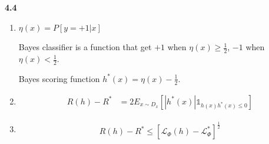 \documentclass[12pt]{article}
\begin{document}
\noindent \textbf{4.4}

\begin{enumerate}[label=(\alph*), left=0pt]
    \item 
    $\eta(x) = P[y=+1 | x]$

    Bayes classifier is a function that get $+1$ when $\eta(x) \ge \frac{1}{2}$, $-1$ when $\eta(x) <
    \frac{1}{2}$. 

    Bayes scoring function $h^{*}(x) = \eta(x) - \frac{1}{2}$.

    \item 
    \begin{align*}
        R(h) - R^{*} &= 2 E_{x \sim D_{x}}[|h^{*}(x)| \mathbb{1}_{h(x)h^{*}(x) \le 0}]
    \end{align*}

    \item 
    \begin{align*}
        R(h) - R^{*} \le [\mathcal{L}_{\Phi}(h) - \mathcal{L}_{\Phi}^{*}]^{\frac{1}{2}}
    \end{align*}
\end{enumerate}
\end{document}

